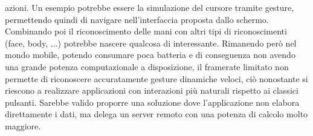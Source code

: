 azioni. Un esempio potrebbe essere la simulazione del cursore tramite gesture, permettendo quindi di navigare nell'interfaccia proposta 
dallo schermo. Combinando poi il riconoscimento delle mani con altri tipi di riconoscimenti (face, body, ...) potrebbe 
nascere qualcosa di interessante. Rimanendo però nel mondo mobile, potendo consumare poca batteria e di 
conseguenza non avendo una grande potenza computazionale a disposizione, il framerate limitato non permette di riconoscere accuratamente gesture dinamiche 
veloci, ciò nonostante si riescono a realizzare applicazioni con interazioni più naturali rispetto ai classici pulsanti. Sarebbe valido proporre una soluzione 
dove l'applicazione non elabora direttamente i dati, ma delega un server remoto con una potenza di calcolo molto maggiore.